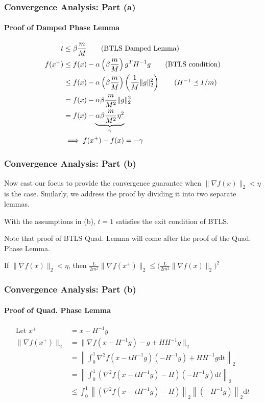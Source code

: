 \documentclass{beamer}
\begin{document}
\begin{frame}
    \frametitle{Convergence Analysis: Part (a)} 
    \framesubtitle{Proof of Damped Phase Lemma}
	\begin{align}
	t &\leq \beta \frac{m}{M} \tag{BTLS Damped Lemma} \\
	f(x^+) &\leq f(x) - \alpha\left(\beta \frac{m}{M} \right) g^T H^{-1} g \tag{BTLS condition} \\
	&\leq f(x) - \alpha\left(\beta \frac{m}{M} \right) \left(\frac{1}{M}\|g\|_2^2 \right) \tag{$H^{-1} \preceq I/m$} \\
	&= f(x) - \alpha\beta \frac{m}{M^2}\|g\|_2^2 \notag \\
	&= f(x) - \underbrace{\alpha\beta \frac{m}{M^2} \eta^2}_{\gamma} \\
	&\implies f(x^+) - f(x) = - \gamma
	\end{align}
\end{frame}
\begin{frame}
    \frametitle{Convergence Analysis: Part (b)}
    Now cast our focus to provide the convergence guarantee when $\|\nabla
    f(x)\|_2 < \eta$ is the case. Smilarly, we address the proof by dividing
    it into two separate lemmas.
    \begin{lemma}
        With the assumptions in (b), $t = 1$ satisfies the exit condition of BTLS.
    \end{lemma}
    Note that proof of BTLS Quad. Lemma will come after the proof of the Quad.
    Phase Lemma.
    \begin{lemma}
        If $\|\nabla f(x)\|_2 < \eta$, then 
        $ \frac{L}{2m^2} \|\nabla_{}f(x^{+})\|_2 \leq
                \bigg(\frac{L}{2m^2} \|\nabla f(x)\|_2 \bigg)^2 $
    \end{lemma}

\end{frame}
\begin{frame}
    \frametitle{Convergence Analysis: Part (b)}
    \framesubtitle{Proof of Quad. Phase Lemma}
    \begin{align}
        \text{Let } x^+ &= x - H^{-1}g \tag{BTLS Quad. Lemma} \\
    \| \nabla f(x^{+})\|_2 &= \| \nabla f(x-H^{-1}g) - g + HH^{-1}g \|_2 \tag{Add zero} \\
	&= \left\|\int_{0}^{1} \nabla^2 f(x-tH^{-1}g) (-H^{-1}g) + HH^{-1}g \mathrm{d}t \right\|_2 \tag{Fund. Theorem of Calculus} \\
	&= \left\| \int_{0}^{1} (\nabla^2 f(x-tH^{-1}g) - H) (-H^{-1}g) \mathrm{d}t \right\|_2 \tag{Rearrange} \\
	&\leq \int_{0}^{1} \left\| (\nabla^2 f(x-tH^{-1}g) - H)\right\|_2 \left\| (-H^{-1}g)\right\|_2 \mathrm{d}t  \tag{Triangle inequality of norms}
    \end{align}
\end{frame}
\end{document}
